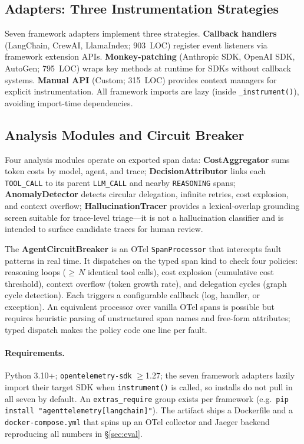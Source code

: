 \documentclass[sigconf,review]{acmart}
\begin{document}
\subsection{Adapters: Three Instrumentation Strategies}

Seven framework adapters implement three strategies.
\textbf{Callback handlers} (LangChain, CrewAI, LlamaIndex; 903~LOC)
register event listeners via framework extension APIs.
\textbf{Monkey-patching} (Anthropic SDK, OpenAI SDK, AutoGen; 795~LOC)
wraps key methods at runtime for SDKs without callback systems.
\textbf{Manual API} (Custom; 315~LOC) provides context managers for
explicit instrumentation.
All framework imports are lazy (inside \texttt{\_instrument()}),
avoiding import-time dependencies.


\subsection{Analysis Modules and Circuit Breaker}

Four analysis modules operate on exported span data:
\textbf{CostAggregator} sums token costs by model, agent, and trace;
\textbf{DecisionAttributor} links each \texttt{TOOL\_CALL} to its
parent \texttt{LLM\_CALL} and nearby \texttt{REASONING} spans;
\textbf{AnomalyDetector} detects circular delegation, infinite
retries, cost explosion, and context overflow;
\textbf{HallucinationTracer} provides a lexical-overlap grounding
screen suitable for trace-level triage---it is not a hallucination
classifier and is intended to surface candidate traces for human
review.

The \textbf{AgentCircuitBreaker} is an OTel
\texttt{Span\-Processor} that intercepts fault patterns in real
time.  It dispatches on the typed span kind to check
four policies: reasoning loops ($\geq$\,$N$ identical tool calls),
cost explosion (cumulative cost threshold), context overflow (token
growth rate), and delegation cycles (graph cycle detection).  Each
triggers a configurable callback (log, handler, or exception).  An
equivalent processor over vanilla OTel spans is possible but requires
heuristic parsing of unstructured span names and free-form attributes;
typed dispatch makes the policy code one line per fault.

\paragraph*{Requirements.} Python 3.10+; \texttt{opentelemetry-sdk}
$\geq$1.27; the seven framework adapters lazily import their target
SDK when \texttt{instrument()} is called, so installs do not pull in
all seven by default.  An \texttt{extras\_require} group exists per
framework (e.g.\ \texttt{pip install "agenttelemetry[langchain]"}).
The artifact ships a Dockerfile and a \texttt{docker-compose.yml} that
spins up an OTel collector and Jaeger backend reproducing all numbers
in \S\ref{sec:eval}.
\end{document}
